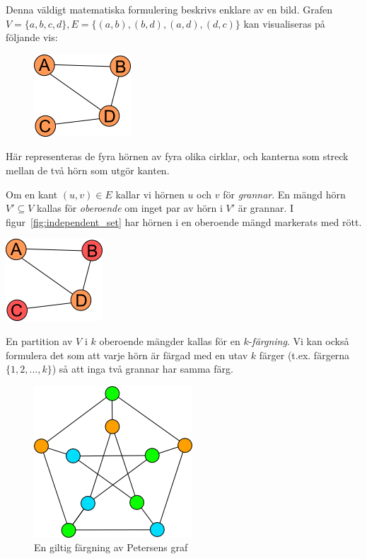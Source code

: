 \documentclass[a4paper]{report}
\begin{document}
Denna väldigt matematiska formulering beskrivs enklare av en bild. Grafen $V = \{a, b, c, d\}, E = \{(a, b), (b, d), (a, d), (d, c)\}$ kan visualiseras på följande vis:

\begin{figure}[h]
    \centering
    \includegraphics{graf.png}
\end{figure}

Här representeras de fyra hörnen av fyra olika cirklar, och kanterna som streck mellan de två hörn som utgör kanten.

Om en kant $(u, v) \in E$ kallar vi hörnen $u$ och $v$ för \emph{grannar}. En mängd hörn $V' \subseteq V$ kallas för \emph{oberoende} om inget par av hörn i $V'$ är grannar. I figur~\ref{fig:independent_set} har hörnen i en oberoende mängd
markerats med rött.

\begin{center}
    \centering
    \includegraphics{oberoende_graf.png}
\label{fig:independent_set}
\end{center}

En partition av $V$ i $k$ oberoende mängder kallas för en $k$-\emph{färgning}. Vi kan också formulera det som att varje hörn är färgad
med en utav $k$ färger (t.ex. färgerna $\{1, 2, ..., k\}$) så att inga två grannar har samma färg.

\begin{figure}[h!]
\centering
\includegraphics{giltig_petersen}
\caption{En giltig färgning av Petersens graf }
\label{fig:petersen_coloring}
\end{figure}
\end{document}
